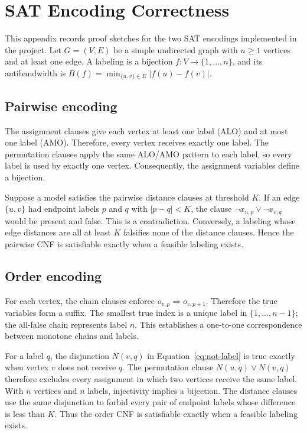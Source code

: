 \section{SAT Encoding Correctness}
\label{app:sat-correctness}

This appendix records proof sketches for the two SAT encodings implemented in
the project. Let $G=(V,E)$ be a simple undirected graph with $n\geq 1$ vertices
and at least one edge. A labeling is a bijection
$f:V\rightarrow\{1,\ldots,n\}$, and its antibandwidth is
$B(f)=\min_{\{u,v\}\in E}|f(u)-f(v)|$.

\subsection{Pairwise encoding}
The assignment clauses give each vertex at least one label (ALO) and at most
one label (AMO). Therefore, every vertex receives exactly one label. The
permutation clauses apply the same ALO/AMO pattern to each label, so every
label is used by exactly one vertex. Consequently, the assignment variables
define a bijection.

Suppose a model satisfies the pairwise distance clauses at threshold $K$.
If an edge $\{u,v\}$ had endpoint labels $p$ and $q$ with
$|p-q|<K$, the clause $\neg x_{u,p}\vee\neg x_{v,q}$ would be present and
false. This is a contradiction. Conversely, a labeling whose edge distances
are all at least $K$ falsifies none of the distance clauses. Hence the
pairwise CNF is satisfiable exactly when a feasible labeling exists.

\subsection{Order encoding}
For each vertex, the chain clauses enforce
$o_{v,p}\Rightarrow o_{v,p+1}$. Therefore the true variables form a suffix.
The smallest true index is a unique label in $\{1,\ldots,n-1\}$; the all-false
chain represents label $n$. This establishes a one-to-one correspondence
between monotone chains and labels.

For a label $q$, the disjunction $N(v,q)$ in
Equation~\ref{eq:not-label} is true exactly when vertex $v$ does not receive
$q$. The permutation clause $N(u,q)\vee N(v,q)$ therefore excludes every
assignment in which two vertices receive the same label. With $n$ vertices
and $n$ labels, injectivity implies a bijection. The distance clauses use the
same disjunction to forbid every pair of endpoint labels whose difference is
less than $K$. Thus the order CNF is satisfiable exactly when a feasible
labeling exists.

